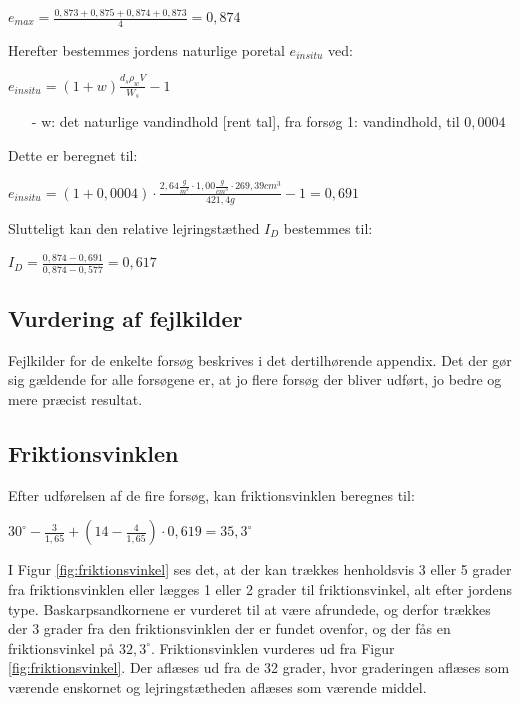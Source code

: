 \begin{center}
	$e_{max} = \frac{0,\!873 + 0,\!875 + 0,\!874 + 0,\!873}{4} = 0,\!874$
\end{center}

Herefter bestemmes jordens naturlige poretal $e_{in situ}$ ved:

\begin{center}
	$e_{in situ} = (1 + w) \frac{d_s  \rho_w  V}{W_s} - 1$
\end{center}

\begin{itemize}
	\item[-] w: det naturlige vandindhold [rent tal], fra forsøg 1: vandindhold, til $0,\!0004$ 
\end{itemize}

Dette er beregnet til:

\begin{center}
	$e_{in situ} = (1+0,\!0004) \cdot \frac{2,\!64 \frac{g}{m^3} \cdot 1,\!00 \frac{g}{cm^3} \cdot 269,\!39 cm^3}{421,\!4 g} - 1 = 0,\!691$
\end{center}

Slutteligt kan den relative lejringstæthed $I_D$ bestemmes til:

\begin{center}
	$I_D = \frac{0,\!874 - 0,\!691}{0,\!874 - 0,\!577} = 0,\!617$
\end{center}

\subsection{Vurdering af fejlkilder}
Fejlkilder for de enkelte forsøg beskrives i det dertilhørende appendix. Det der gør sig gældende for alle forsøgene er, at jo flere forsøg der bliver udført, jo bedre og mere præcist resultat. 

\subsection{Friktionsvinklen}
Efter udførelsen af de fire forsøg, kan friktionsvinklen beregnes til:

\begin{center}
	$30^\circ - \frac{3}{1,\!65} + (14 - \frac{4}{1,\!65}) \cdot 0,\!619 = 35,\!3^\circ$
\end{center}

I Figur \ref{fig:friktionsvinkel} ses det, at der kan trækkes henholdsvis 3 eller 5 grader fra friktionsvinklen eller lægges 1 eller 2 grader til friktionsvinkel, alt efter jordens type. Baskarpsandkornene er vurderet til at være afrundede, og derfor trækkes der 3 grader fra den friktionsvinklen der er fundet ovenfor, og der fås en friktionsvinkel på $32,\!3^\circ$. 
\newline
\newline
Friktionsvinklen vurderes ud fra Figur \ref{fig:friktionsvinkel}. Der aflæses ud fra de 32 grader, hvor graderingen aflæses som værende enskornet og lejringstætheden aflæses som værende middel.


